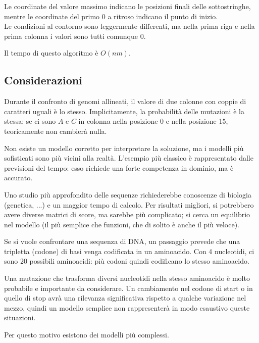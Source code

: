 Le coordinate del valore massimo indicano le posizioni finali delle sottostringhe, mentre le coordinate del primo 0 a ritroso indicano il punto di inizio. \\
Le condizioni al contorno sono leggermente differenti, ma nella prima riga e nella prima colonna i valori sono tutti comunque 0.

Il tempo di questo algoritmo è $O(nm)$.

\subsection{Considerazioni}
Durante il confronto di genomi allineati, il valore di due colonne con coppie di caratteri uguali è lo stesso. Implicitamente, la probabilità delle mutazioni è la stessa: se ci sono $A$ e $C$ in colonna nella posizione 0 e nella posizione 15, teoricamente non cambierà nulla.

Non esiste un modello corretto per interpretare la soluzione, ma i modelli più sofisticati sono più vicini alla realtà. L'esempio più classico è rappresentato dalle previsioni del tempo: esso richiede una forte competenza in dominio, ma è accurato. 

Uno studio più approfondito delle sequenze richiederebbe conoscenze di biologia (genetica, ...) e un maggior tempo di calcolo. Per risultati migliori, si potrebbero avere diverse matrici di score, ma sarebbe più complicato; si cerca un equilibrio nel modello (il più semplice che funzioni, che di solito è anche il più veloce).

Se si vuole confrontare una sequenza di DNA, un passaggio prevede che una tripletta (codone) di basi venga codificata in un aminoacido. Con 4 nucleotidi, ci sono 20 possibili aminoacidi: più codoni quindi codificano lo stesso aminoacido. 

Una mutazione che trasforma diversi nucleotidi nella stesso aminoacido è molto probabile e importante da considerare. Un cambiamento nel codone di start o in quello di stop avrà una rilevanza significativa rispetto a qualche variazione nel mezzo, quindi un modello semplice non rappresenterà in modo esaustivo queste situazioni.

Per questo motivo esistono dei modelli più complessi.